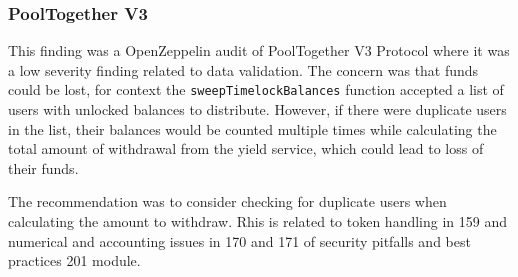 \subsubsection{PoolTogether V3}\label{pooltogether-v3}

This finding was a OpenZeppelin audit of PoolTogether V3 Protocol where
it was a low severity finding related to data validation. The concern
was that funds could be lost, for context the
\texttt{sweepTimelockBalances} function accepted a list of users with
unlocked balances to distribute. However, if there were duplicate users
in the list, their balances would be counted multiple times while
calculating the total amount of withdrawal from the yield service, which
could lead to loss of their funds.

The recommendation was to consider checking for duplicate users when
calculating the amount to withdraw. Rhis is related to token handling in
159 and numerical and accounting issues in 170 and 171 of security
pitfalls and best practices 201 module.
